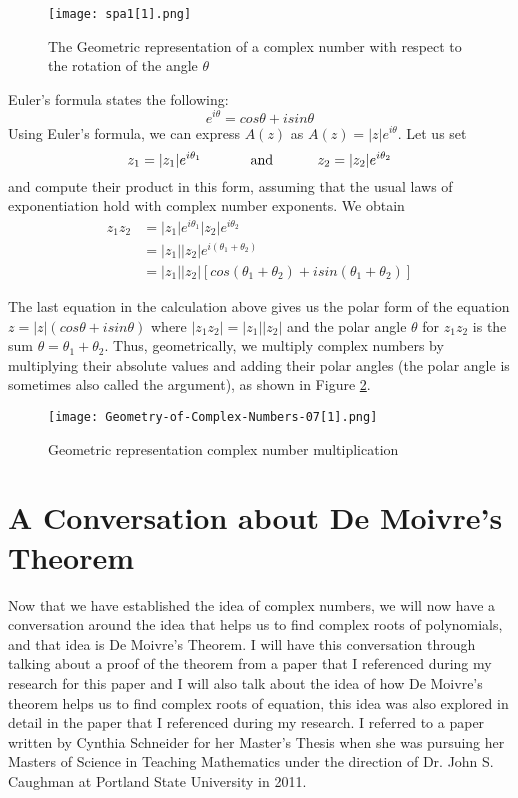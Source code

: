 \documentclass{turabian-researchpaper}
\begin{document}
\begin{figure}[H]
      \centering
    \texttt{[image: spa1[1].png]} 
    \caption{The Geometric representation of a complex number with respect to the rotation of the angle $\theta$\cite{byju's2024}}
    \label{fig:ang-rot}
\end{figure} 

Euler's formula states the following: $$e^{i\theta} = cos\theta + isin\theta$$  Using Euler's formula, we can express $A(z)$ as $A(z) = |z|e^{i\theta}$. Let us set \[z_1 = |z_1|e^{i\theta_1}  \text{ \hspace{1cm} and \hspace{1cm}} z_2 = |z_2|e^{i\theta_2}\] and compute their product in this form, assuming that the usual laws of exponentiation hold with complex number exponents. We obtain 
\begin{align*}
    z_1z_2 &= |z_1|e^{i\theta_1}|z_2|e^{i\theta_2} \\ 
           &= |z_1||z_2|e^{i(\theta_1 + \theta_2)} \\ 
           &= |z_1||z_2|[cos(\theta_1 + \theta_2) + isin(\theta_1 + \theta_2)]
\end{align*} 

The last equation in the calculation above gives us the polar form of the equation \(z = |z|(cos\theta + isin\theta)\) where \(|z_1z_2| = |z_1||z_2|\) and the polar angle $\theta$ for \(z_1z_2\) is the sum $\theta = \theta_1 + \theta_2$. Thus, geometrically, we multiply complex numbers by multiplying their absolute values and adding their polar angles (the polar angle is sometimes also called the argument\cite{highermath2024}), as shown in Figure \ref{fig:comp-prod}. 


\begin{figure}[H] 
    \centering
    \texttt{[image: Geometry-of-Complex-Numbers-07[1].png]} 
    \caption{Geometric representation complex number multiplication\cite{byju's2024prod}}
    \label{fig:comp-prod}
\end{figure} 

\section{A Conversation about De Moivre's Theorem} 

Now that we have established the idea of complex numbers, we will now have a conversation around the idea that helps us to find complex roots of polynomials, and that idea is De Moivre's Theorem. I will have this conversation through talking about a proof of the theorem from a paper that I referenced during my research for this paper and I will also talk about the idea of how De Moivre's theorem helps us to find complex roots of equation, this idea was also explored in detail in the paper that I referenced during my research. I referred to a paper written by Cynthia Schneider for her Master's Thesis when she was pursuing her Masters of Science in Teaching Mathematics under the direction of Dr. John S. Caughman at Portland State University in 2011. 
\end{document}
